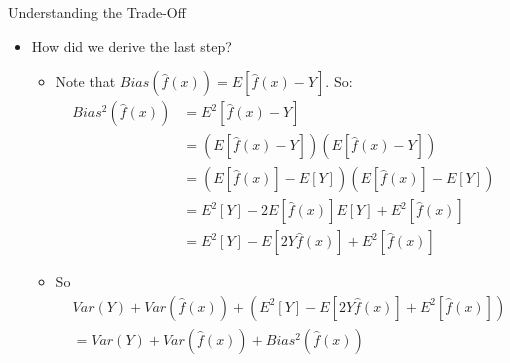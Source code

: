 \documentclass[aspectratio=169]{beamer}
\begin{document}
\begin{frame}{Understanding the Trade-Off}

\begin{itemize}
\item How did we derive the last step? 
	\begin{itemize}
	\item Note that $Bias(\hat{f}(x)) = E[\hat{f}(x) - Y]$. So:
	\begin{align} 
	Bias^2(\hat{f}(x)) &= E^2[\hat{f}(x) - Y] \nonumber \\
			   &= (E[\hat{f}(x) - Y])(E[\hat{f}(x) - Y]) \nonumber \\
			   &= (E[\hat{f}(x)] - E[Y])(E[\hat{f}(x)] - E[Y]) \nonumber \\
			   &= E^2[Y] - 2E[\hat{f}(x)]E[Y] + E^2[\hat{f}(x)] \nonumber \\
			   &= E^2[Y] - E[2Y\hat{f}(x)] + E^2[\hat{f}(x)] \nonumber
	\end{align}
	\item So
	\begin{align}
		&Var(Y) + Var(\hat{f}(x)) + (E^2[Y] - E[2Y\hat{f}(x)] + E^2[\hat{f}(x)]) \nonumber \\
		&= Var(Y) + Var(\hat{f}(x)) + Bias^2(\hat{f}(x)) \nonumber
	\end{align}
	\end{itemize}
\end{itemize}
\end{frame}

\end{document}

